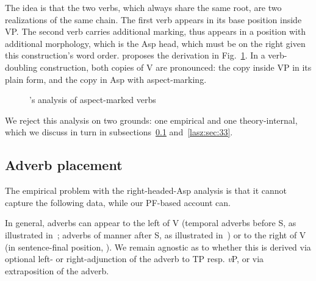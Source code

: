 \documentclass[output=paper,colorlinks,citecolor=brown,
]{langscibook}
\newcommand{\citeapos}[1]{\citeauthor{#1}'s \citeyearpar{#1}}
\begin{document}
The idea is that the two verbs, which always share the same root, are
two realizations of the same chain. The first verb appears in its base
position inside VP. The second verb carries additional marking, thus
appears in a position with additional morphology, which is the Asp
head, which must be on the right given this construction’s word order.
\citet{Matsuoka.1997} proposes the derivation in Fig.~\ref{lasz:fig:2}. In a verb-doubling
construction, both copies of V are pronounced: the copy inside VP in
its plain form, and the copy in Asp with aspect-marking.

\begin{figure}
    \centering
    \caption{\citeapos{Matsuoka.1997} analysis of aspect-marked verbs}
    \label{lasz:fig:2}
\end{figure}

We reject this analysis on two grounds: one empirical and one
theory-internal, which we discuss in turn in subsections~\ref{lasz:sec:32} and~\ref{lasz:sec:33}.

\subsection{Adverb placement}
\label{lasz:sec:32}

The empirical problem with the right-headed-Asp analysis is that it
cannot capture the following data, while our PF-based account can.

In general, adverbs can appear to the left of V (temporal
adverbs before S, as illustrated in~; adverbs of manner after S, as
illustrated in~) or to the right of V (in sentence-final position,
). We remain agnostic as to whether this is derived via optional
left- or right-adjunction of the adverb to TP resp. \textit{v}P, or via
extraposition of the adverb.
\end{document}
